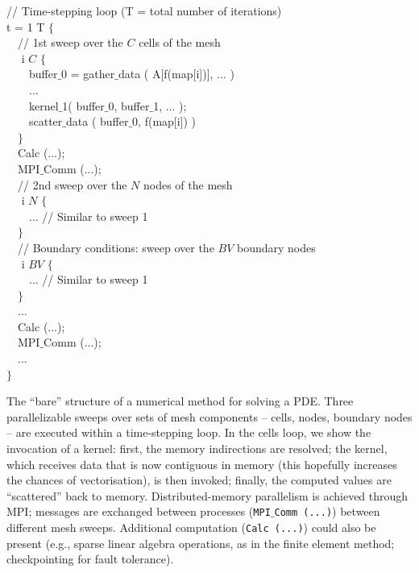 \begin{algorithm}[t]
\scriptsize\ttfamily
{}

// Time-stepping loop (T = total number of iterations)\\
 t = 1  T $\lbrace$\\
~~// 1st sweep over the $C$ cells of the mesh\\
~~ i  $C$ $\lbrace$\\
~~~~buffer$\_$0 = gather$\_$data ( A[f(map[i])], ... )\\
~~~~...\\
~~~~kernel$\_$1( buffer$\_$0, buffer$\_$1, ... );\\
~~~~scatter$\_$data ( buffer$\_$0, f(map[i]) )\\
~~$\rbrace$\\
~~Calc (...);\\
~~MPI$\_$Comm (...); \\
~~// 2nd sweep over the $N$ nodes of the mesh\\
~~ i  $N$ $\lbrace$\\
~~~~... // Similar to sweep 1 \\
~~$\rbrace$\\
~~// Boundary conditions: sweep over the $BV$ boundary nodes\\
~~ i  $BV$ $\lbrace$\\
~~~~... // Similar to sweep 1 \\
~~$\rbrace$\\
~~...\\
~~Calc (...);\\
~~MPI$\_$Comm (...); \\
~~...\\
$\rbrace$
\caption{The ``bare'' structure of a numerical method for solving a PDE. Three parallelizable sweeps over sets of mesh components -- cells, nodes, boundary nodes -- are executed within a time-stepping loop. In the cells loop, we show the invocation of a kernel: first, the memory indirections are resolved; the kernel, which receives data that is now contiguous in memory (this hopefully increases the chances of vectorisation),  is then invoked; finally, the computed values are ``scattered'' back to memory. Distributed-memory parallelism is achieved through MPI; messages are exchanged between processes (\texttt{MPI$\_$Comm (...)}) between different mesh sweeps. Additional computation (\texttt{Calc (...)}) could also be present (e.g., sparse linear algebra operations, as in the finite element method; checkpointing for fault tolerance).}
\label{code:tiling-struct}
\end{algorithm}


